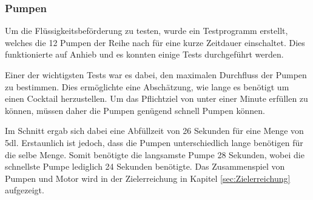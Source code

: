 \subsubsection{Pumpen}
\label{subsubsec:Inbetriebnahme_Pumpen}

Um die Flüssigkeitsbeförderung zu testen, wurde ein Testprogramm erstellt, welches die 12 Pumpen der Reihe nach für eine kurze Zeitdauer einschaltet. Dies funktionierte auf Anhieb und es konnten einige Tests durchgeführt werden. 

Einer der wichtigsten Tests war es dabei, den maximalen Durchfluss der Pumpen zu bestimmen. Dies ermöglichte eine Abschätzung, wie lange es benötigt um einen Cocktail herzustellen. Um das Pflichtziel von unter einer Minute erfüllen zu können, müssen daher die Pumpen genügend schnell Pumpen können.

Im Schnitt ergab sich dabei eine Abfüllzeit von 26 Sekunden für eine Menge von 5dl. Erstaunlich ist jedoch, dass die Pumpen unterschiedlich lange benötigen für die selbe Menge. Somit benötigte die langsamste Pumpe 28 Sekunden, wobei die schnellste Pumpe lediglich 24 Sekunden benötigte. Das Zusammenspiel von Pumpen und Motor wird in der Zielerreichung in Kapitel \ref{sec:Zielerreichung} aufgezeigt.